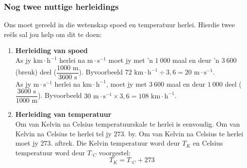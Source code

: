 \subsubsection*{Nog twee nuttige herleidings}
            \nopagebreak
Ons moet gereeld in die wetenskap spoed en temperatuur herlei. Hierdie twee reëls sal jou help om dit te doen:
\begin{enumerate}[label=\textbf{\arabic*}.]
\item \textbf{Herleiding van spoed}\\
As jy $\text{km} \cdot \text{h}^{-1}$ herlei na $\text{m} \cdot \text{s}^{-1}$ moet jy met 'n $1~000$ maal en deur 'n $3~600$ (breuk) deel ($\dfrac{1000 \text{ m}}{3600 \text{ s}}$). Byvoorbeeld $72 \text{ km} \cdot \text{h}^{-1} \div 3,6 = 20 \text{ m}\cdot \text{s}^{-1}$.\\  
As jy $\text{m}\cdot \text{s}^{-1}$ herlei na $\text{km} \cdot \text{h}^{-1}$, moet jy met $3~600$ maal en deur $1~000$ deel ($\dfrac{3600 \text{ s}}{1000 \text{ m}}$). Byvoorbeeld $30 \text{ m}\cdot \text{s}^{-1} \times 3,6 = 108 \text{ km} \cdot \text{h}^{-1}$. 
\item \textbf{Herleiding van temperatuur}\\
Om van Kelvin na Celsius temperatuurskale te herlei is eenvoudig. Om van Kelvin na Celsius te herlei tel jy $273$. by. Om van Kelvin na Celsius te herlei moet jy $273$. aftrek. Die Kelvin temperatuur word deur ${T}_{K}$ en Celsius temperatuur word deur ${T}_{^{\circ}C}$ voorgestel:         
    \begin{equation*}
    {T}_{K}={T}_{^{\circ}C} + 273
      \end{equation*}
\end{enumerate}

